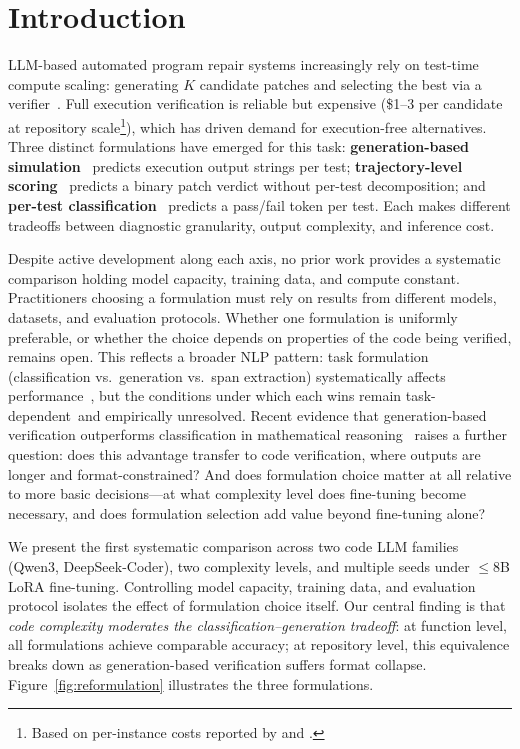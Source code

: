 \section{Introduction}
\label{sec:introduction}

LLM-based automated program repair systems increasingly rely on test-time compute scaling: generating $K$ candidate patches and selecting the best via a verifier~\cite{snell2024scaling}. Full execution verification is reliable but expensive (\$1--3 per candidate at repository scale\footnote{Based on per-instance costs reported by \citet{yang2024sweagent} and \citet{xia2024agentless}.}), which has driven demand for execution-free alternatives. Three distinct formulations have emerged for this task: \textbf{generation-based simulation}~\cite{meta2025cwm,maimon2026selfexecution} predicts execution output strings per test; \textbf{trajectory-level scoring}~\cite{shum2025swerm} predicts a binary patch verdict without per-test decomposition; and \textbf{per-test classification}~\cite{ni2023lever,chen2023codet} predicts a pass/fail token per test. Each makes different tradeoffs between diagnostic granularity, output complexity, and inference cost.

Despite active development along each axis, no prior work provides a systematic comparison holding model capacity, training data, and compute constant. Practitioners choosing a formulation must rely on results from different models, datasets, and evaluation protocols. Whether one formulation is uniformly preferable, or whether the choice depends on properties of the code being verified, remains open. This reflects a broader NLP pattern: task formulation (classification vs.\ generation vs.\ span extraction) systematically affects performance~\cite{raffel2020t5}, but the conditions under which each wins remain task-dependent~and empirically unresolved. Recent evidence that generation-based verification outperforms classification in mathematical reasoning~\cite{hosseini2025genrm} raises a further question: does this advantage transfer to code verification, where outputs are longer and format-constrained? And does formulation choice matter at all relative to more basic decisions---at what complexity level does fine-tuning become necessary, and does formulation selection add value beyond fine-tuning alone?

We present the first systematic comparison across two code LLM families (Qwen3, DeepSeek-Coder), two complexity levels, and multiple seeds under ${\leq}$8B LoRA fine-tuning. Controlling model capacity, training data, and evaluation protocol isolates the effect of formulation choice itself. Our central finding is that \emph{code complexity moderates the classification--generation tradeoff}: at function level, all formulations achieve comparable accuracy; at repository level, this equivalence breaks down as generation-based verification suffers format collapse. Figure~\ref{fig:reformulation} illustrates the three formulations.

